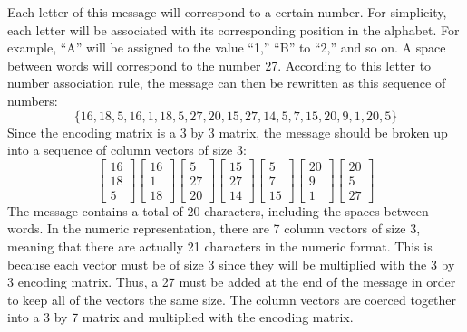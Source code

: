 \documentclass{article}
\begin{document}
\noindent
Each letter of this message will correspond to a certain number. For simplicity, each letter will be associated with its corresponding position in the alphabet. For example, ``A” will be assigned to the value ``1,” ``B” to ``2,” and so on. A space between words will correspond to the number 27. According to this letter to number association rule, the message can then be rewritten as this sequence of numbers:
$$
\{16, 18, 5, 16, 1, 18, 5, 27, 20, 15, 27, 14, 5, 7, 15, 20, 9, 1, 20, 5\}
$$
Since the encoding matrix is a 3 by 3 matrix, the message should be broken up into a sequence of column vectors of size 3:
$$
\begin{bmatrix}
16\\
18\\
5
\end{bmatrix}
\begin{bmatrix}
16\\
1\\
18
\end{bmatrix}
\begin{bmatrix}
5\\
27\\
20
\end{bmatrix}
\begin{bmatrix}
15\\
27\\
14
\end{bmatrix}
\begin{bmatrix}
5\\
7\\
15
\end{bmatrix}
\begin{bmatrix}
20\\
9\\
1
\end{bmatrix}
\begin{bmatrix}
20\\
5\\
27
\end{bmatrix}
$$ 
The message contains a total of 20 characters, including the spaces between words. In the numeric representation, there are 7 column vectors of size 3, meaning that there are actually 21 characters in the numeric format. This is because each vector must be of size 3 since they will be multiplied with the 3 by 3 encoding matrix. Thus, a 27 must be added at the end of the message in order to keep all of the vectors the same size. The column vectors are coerced together into a 3 by 7 matrix and  multiplied with the encoding matrix.
\end{document}
